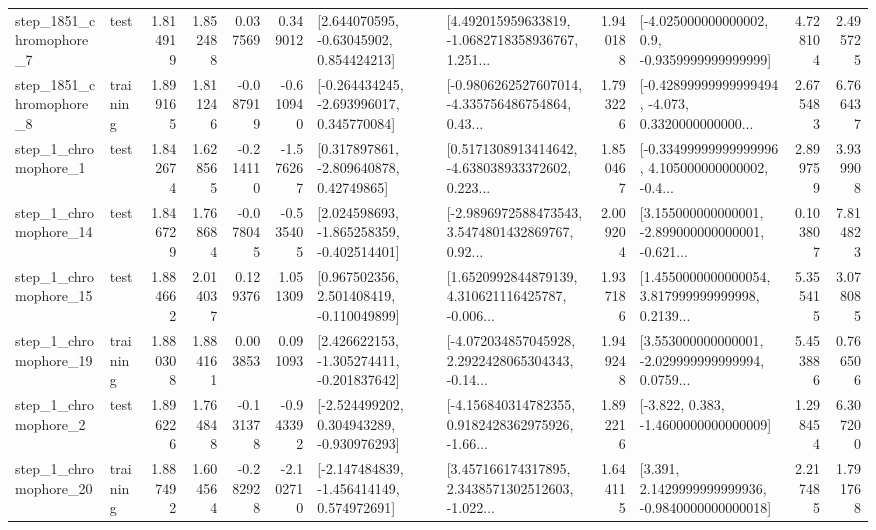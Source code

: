 \begin{tabular}{llrrrrllrlrr}
  step\_1851\_chromophore\_7 &      test &      1.814919 &    1.852488 &      0.037569 &  0.349012 &     [2.644070595, -0.63045902, 0.854424213] &  [4.492015959633819, -1.0682718358936767, 1.251... &       1.940188 &     [-4.025000000000002, 0.9, -0.9359999999999999] &            4.728104 &          2.495725 \\
  step\_1851\_chromophore\_8 &  training &      1.899165 &    1.811246 &     -0.087919 & -0.610940 &   [-0.264434245, -2.693996017, 0.345770084] &  [-0.9806262527607014, -4.335756486754864, 0.43... &       1.793226 &  [-0.42899999999999494, -4.073, 0.3320000000000... &            2.675483 &          6.766437 \\
     step\_1\_chromophore\_1 &      test &      1.842674 &    1.628565 &     -0.214110 & -1.576267 &     [0.317897861, -2.809640878, 0.42749865] &  [0.5171308913414642, -4.638038933372602, 0.223... &       1.850467 &  [-0.33499999999999996, 4.105000000000002, -0.4... &            2.899759 &          3.939908 \\
    step\_1\_chromophore\_14 &      test &      1.846729 &    1.768684 &     -0.078045 & -0.535405 &   [2.024598693, -1.865258359, -0.402514401] &  [-2.9896972588473543, 3.5474801432869767, 0.92... &       2.009204 &  [3.155000000000001, -2.899000000000001, -0.621... &            0.103807 &          7.814823 \\
    step\_1\_chromophore\_15 &      test &      1.884662 &    2.014037 &      0.129376 &  1.051309 &    [0.967502356, 2.501408419, -0.110049899] &  [1.6520992844879139, 4.310621116425787, -0.006... &       1.937186 &  [1.4550000000000054, 3.817999999999998, 0.2139... &            5.355415 &          3.078085 \\
    step\_1\_chromophore\_19 &  training &      1.880308 &    1.884161 &      0.003853 &  0.091093 &   [2.426622153, -1.305274411, -0.201837642] &  [-4.072034857045928, 2.2922428065304343, -0.14... &       1.949248 &  [3.553000000000001, -2.029999999999994, 0.0759... &            5.453886 &          0.766506 \\
     step\_1\_chromophore\_2 &      test &      1.896226 &    1.764848 &     -0.131378 & -0.943392 &   [-2.524499202, 0.304943289, -0.930976293] &  [-4.156840314782355, 0.9182428362975926, -1.66... &       1.892216 &               [-3.822, 0.383, -1.4600000000000009] &            1.298454 &          6.307200 \\
    step\_1\_chromophore\_20 &  training &      1.887492 &    1.604564 &     -0.282928 & -2.102710 &   [-2.147484839, -1.456414149, 0.574972691] &  [3.457166174317895, 2.3438571302512603, -1.022... &       1.644115 &   [3.391, 2.1429999999999936, -0.9840000000000018] &            2.217485 &          1.791768 \\

\end{tabular}
